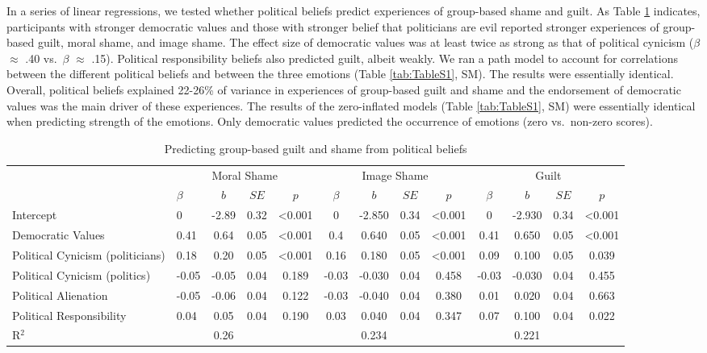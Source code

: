 \documentclass[
]{article}
\begin{document}
In a series of linear regressions, we tested whether political beliefs predict experiences of group-based shame and guilt. As Table \ref{tab:Table1} indicates, participants with stronger democratic values and those with stronger belief that politicians are evil reported stronger experiences of group-based guilt, moral shame, and image shame. The effect size of democratic values was at least twice as strong as that of political cynicism (\(\beta\) \(\approx\) .40 vs.~\(\beta\) \(\approx\) .15). Political responsibility beliefs also predicted guilt, albeit weakly. We ran a path model to account for correlations between the different political beliefs and between the three emotions (Table \ref{tab:TableS1}, SM). The results were essentially identical. Overall, political beliefs explained 22-26\% of variance in experiences of group-based guilt and shame and the endorsement of democratic values was the main driver of these experiences. The results of the zero-inflated models (Table \ref{tab:TableS1}, SM) were essentially identical when predicting strength of the emotions. Only democratic values predicted the occurrence of emotions (zero vs.~non-zero scores).

\begin{table}[H]

\caption{\label{tab:Table1}Predicting group-based guilt and shame from political beliefs}
\centering
\fontsize{8}{10}\selectfont
\begin{tabular}[t]{llccccccccccc}
\toprule
\multicolumn{1}{c}{} & \multicolumn{4}{c}{Moral Shame} & \multicolumn{4}{c}{Image Shame} & \multicolumn{4}{c}{Guilt} \\
\cmidrule(l{3pt}r{3pt}){2-5} \cmidrule(l{3pt}r{3pt}){6-9} \cmidrule(l{3pt}r{3pt}){10-13}
  & $\beta$ & $b$ & $SE$ & $p$ & $\beta$ & $b$ & $SE$ & $p$ & $\beta$ & $b$ & $SE$ & $p$\\
\midrule
Intercept & 0 & -2.89 & 0.32 & <0.001 & 0 & -2.850 & 0.34 & <0.001 & 0 & -2.930 & 0.34 & <0.001\\
Democratic Values & 0.41 & 0.64 & 0.05 & <0.001 & 0.4 & 0.640 & 0.05 & <0.001 & 0.41 & 0.650 & 0.05 & <0.001\\
Political Cynicism (politicians) & 0.18 & 0.20 & 0.05 & <0.001 & 0.16 & 0.180 & 0.05 & <0.001 & 0.09 & 0.100 & 0.05 & 0.039\\
Political Cynicism (politics) & -0.05 & -0.05 & 0.04 & 0.189 & -0.03 & -0.030 & 0.04 & 0.458 & -0.03 & -0.030 & 0.04 & 0.455\\
Political Alienation & -0.05 & -0.06 & 0.04 & 0.122 & -0.03 & -0.040 & 0.04 & 0.380 & 0.01 & 0.020 & 0.04 & 0.663\\
\addlinespace
Political Responsibility & 0.04 & 0.05 & 0.04 & 0.190 & 0.03 & 0.040 & 0.04 & 0.347 & 0.07 & 0.100 & 0.04 & 0.022\\
\midrule
R$^{2}$ &  & 0.26 &  &  &  & 0.234 &  &  &  & 0.221 &  & \\
\bottomrule
\end{tabular}
\end{table}
\end{document}
